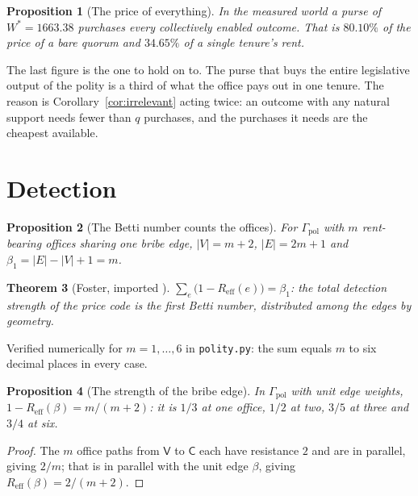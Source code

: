 \documentclass[11pt]{article}
\theoremstyle{plain}
\newtheorem{theorem}{Theorem}[section]
\newtheorem{proposition}[theorem]{Proposition}
\theoremstyle{definition}
\theoremstyle{remark}
\newcommand{\Reff}{R_{\mathrm{eff}}}
\newcommand{\bt}{\beta_1}
\newcommand{\Vt}{\mathsf{V}}
\newcommand{\Ct}{\mathsf{C}}
\begin{document}
\begin{proposition}[The price of everything]
\label{prop:everything}
In the measured world a purse of $W^\ast = 1663.38$ purchases \emph{every}
collectively enabled outcome. That is $80.10\%$ of the price of a bare quorum
and $34.65\%$ of a single tenure's rent.
\end{proposition}

The last figure is the one to hold on to. The purse that buys the entire
legislative output of the polity is a third of what the office pays out in one
tenure. The reason is Corollary~\ref{cor:irrelevant} acting twice: an outcome
with any natural support needs fewer than $q$ purchases, and the purchases it
needs are the cheapest available.

\section{Detection}
\label{sec:detect}

\begin{proposition}[The Betti number counts the offices]
\label{prop:betti}
For $\Gamma_{\mathrm{pol}}$ with $m$ rent-bearing offices sharing one bribe
edge, $|V| = m+2$, $|E| = 2m+1$ and $\bt = |E| - |V| + 1 = m$.
\end{proposition}

\begin{theorem}[Foster, imported {\cite[Thm.~5.4]{engine}}]
\label{thm:foster}
$\sum_{e} \bigl(1 - \Reff(e)\bigr) = \bt$: the total detection strength of the
price code is the first Betti number, distributed among the edges by geometry.
\end{theorem}

Verified numerically for $m = 1,\dots,6$ in \texttt{polity.py}: the sum equals
$m$ to six decimal places in every case.

\begin{proposition}[The strength of the bribe edge]
\label{prop:bribe}
In $\Gamma_{\mathrm{pol}}$ with unit edge weights,
$1 - \Reff(\beta) = m/(m+2)$: it is $1/3$ at one office, $1/2$ at two,
$3/5$ at three and $3/4$ at six.
\end{proposition}

\begin{proof}
The $m$ office paths from $\Vt$ to $\Ct$ each have resistance $2$ and are in
parallel, giving $2/m$; that is in parallel with the unit edge $\beta$, giving
$\Reff(\beta) = 2/(m+2)$.
\end{proof}
\end{document}
